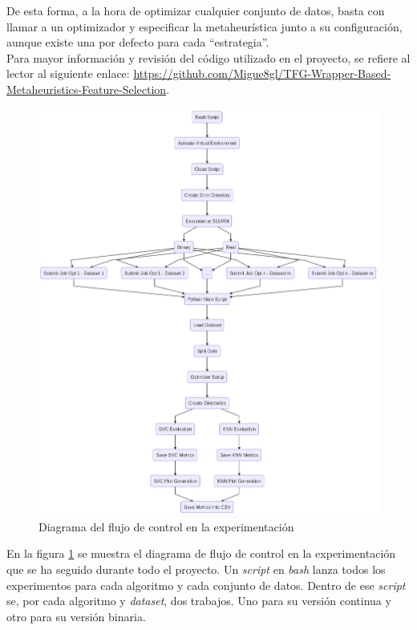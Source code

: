 De esta forma, a la hora de optimizar cualquier conjunto de datos, basta con llamar a un optimizador y especificar la metaheurística junto a su configuración, aunque existe una por defecto para cada ``estrategia''.\\[6pt]
Para mayor información y revisión del código utilizado en el proyecto, se refiere al lector al siguiente enlace: \url{https://github.com/Migue8gl/TFG-Wrapper-Based-Metaheuristics-Feature-Selection}.

\begin{figure}[htp]
    \centering
    \includegraphics[width=1\textwidth]{imagenes/experiments_flow.png}
    \caption{Diagrama del flujo de control en la experimentación}
    \label{fig:flow_diagram_experiments}
\end{figure}

En la figura \ref{fig:flow_diagram_experiments} se muestra el diagrama de flujo de control en la experimentación que se ha seguido durante todo el proyecto. Un \textit{script} en \textit{bash} lanza todos los experimentos para cada algoritmo y cada conjunto de datos. Dentro de ese \textit{script} se, por cada algoritmo y \textit{dataset}, dos trabajos. Uno para su versión continua y otro para su versión binaria.